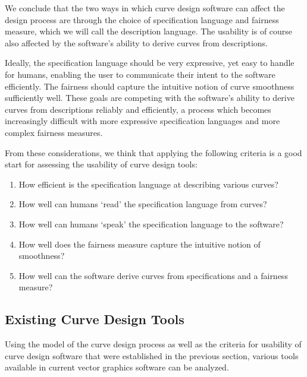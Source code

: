 \documentclass[a4paper]{article}
\begin{document}
			We conclude that the two ways in which curve design software can affect the design process are through the choice of specification language and fairness measure, which we will call the description language. The usability is of course also affected by the software's ability to derive curves from descriptions.

			Ideally, the specification language should be very expressive, yet easy to handle for humans, enabling the user to communicate their intent to the software efficiently. The fairness should capture the intuitive notion of curve smoothness sufficiently well. These goals are competing with the software's ability to derive curves from descriptions reliably and efficiently, a process which becomes increasingly difficult with more expressive specification languages and more complex fairness measures.

			From these considerations, we think that applying the following criteria is a good start for assessing the usability of curve design tools:
			\begin{enumerate}
				\item How efficient is the specification language at describing various curves?
				\item How well can humans `read' the specification language from curves?
				\item How well can humans `speak' the specification language to the software?
				\item How well does the fairness measure capture the intuitive notion of smoothness?
				\item How well can the software derive curves from specifications and a fairness measure?
			\end{enumerate}

		\subsection{Existing Curve Design Tools}
		\label{section:existing_curve_design_tools}

			Using the model of the curve design process as well as the criteria for usability of curve design software that were established in the previous section, various tools available in current vector graphics software can be analyzed.
\end{document}
